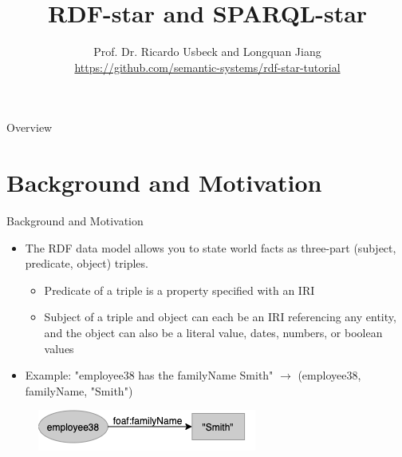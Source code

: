 \documentclass[aspectratio=169]{beamer}
\title[Ontologies]{RDF-star and SPARQL-star}
\author[]{Prof. Dr. Ricardo Usbeck and Longquan Jiang\\
\url{https://github.com/semantic-systems/rdf-star-tutorial}}
\date{}
\begin{document}
\begin{frame}
\titlepage
\end{frame}

\begin{frame}{Overview}{\quad}
\tableofcontents
\end{frame}

\section{Background and Motivation}
\begin{frame}{Background and Motivation}
    \begin{itemize}
        \item The RDF data model allows you to state world facts as three-part (subject, predicate, object) triples.
        \begin{itemize}
            \item Predicate of a triple is a property specified with an IRI
            \item Subject of a triple and object can each be an IRI referencing any entity, and the object can also be a literal value, dates, numbers, or boolean values
        \end{itemize}
        \item Example: "employee38 has the familyName Smith" $\rightarrow$ (employee38, familyName, "Smith")
    \end{itemize}
    \begin{figure}
        \centering
        \includegraphics[scale=0.5]{images/Example-1.png}
    \end{figure}
\end{frame}
\end{document}
